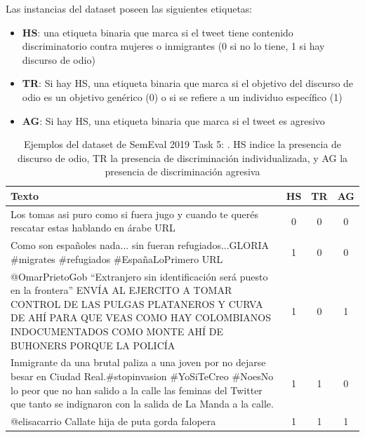 Las instancias del dataset poseen las siguientes etiquetas:

\begin{itemize}
    \item \textbf{HS}: una etiqueta binaria que marca si el tweet tiene contenido discriminatorio contra mujeres o inmigrantes (0 si no lo tiene, 1 si hay discurso de odio)
    \item \textbf{TR}: Si hay HS, una etiqueta binaria que marca si el objetivo del discurso de odio es un objetivo genérico (0) o si se refiere a un individuo específico (1)
    \item \textbf{AG}: Si hay HS, una etiqueta binaria que marca si el tweet es agresivo
\end{itemize}

\begin{table}
    \centering
    \small
    \begin{tabularx}{\textwidth}{X c c c}
        Texto & HS & TR & AG \\
        \hline
        Los tomas asi puro como si fuera jugo y cuando te querés rescatar estas hablando en árabe URL & 0 & 0 & 0 \\
        \rule{0pt}{4ex} Como son españoles nada... sin fueran refugiados...GLORIA \#migrates \#refugiados \#EspañaLoPrimero URL & 1 & 0 & 0 \\
        \rule{0pt}{4ex} @OmarPrietoGob ``Extranjero sin identificación será puesto en la frontera'' ENVÍA AL EJERCITO A TOMAR CONTROL DE LAS PULGAS PLATANEROS Y CURVA DE AHÍ PARA QUE VEAS COMO HAY COLOMBIANOS INDOCUMENTADOS COMO MONTE AHÍ DE BUHONERS PORQUE LA POLICÍA & 1 & 0 & 1 \\
        \rule{0pt}{4ex} Inmigrante da una brutal paliza a una joven por no dejarse besar en Ciudad Real.\#stopinvasion \#YoSiTeCreo \#NoesNo lo peor que no han salido a la calle las feminas del Twitter que tanto se indignaron con la salida de La Manda a la calle. & 1 & 1 & 0 \\
        \rule{0pt}{4ex} @elisacarrio Callate hija de puta gorda falopera & 1 & 1 & 1 \\
        \hline
    \end{tabularx}
    \caption{Ejemplos del dataset de SemEval 2019 Task 5: \hateval{}. HS indice la presencia de discurso de odio, TR la presencia de discriminación individualizada, y AG la presencia de discriminación agresiva}
    \label{tab:hateval_dataset_examples}
\end{table}




